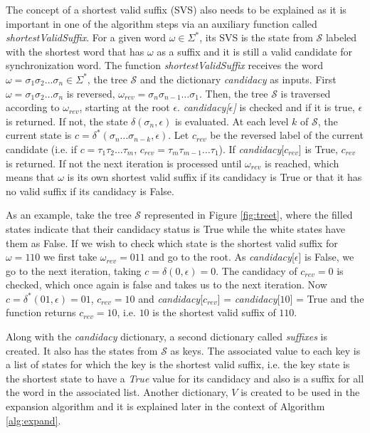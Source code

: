 {The concept of a shortest valid suffix (SVS) also needs to be explained as it is important in one of the algorithm steps via an auxiliary function called \textit{shortestValidSuffix}. For a given word $\omega \in \Sigma^*$, its SVS is the state from $\mathcal{S}$ labeled with the shortest word that has $\omega$ as a suffix and it is still a valid candidate for synchronization word. The function \textit{shortestValidSuffix} receives the word $\omega = \sigma_1\sigma_2\ldots\sigma_n \in \Sigma^*$, the tree $\mathcal{S}$ and the dictionary \textit{candidacy} as inputs. First $\omega = \sigma_1\sigma_2\ldots\sigma_n$ is reversed, $\omega_{rev} = \sigma_n\sigma_{n-1}\ldots\sigma_1$. Then, the tree $\mathcal{S}$ is traversed according to $\omega_{rev}$, starting at the root $\epsilon$. \textit{candidacy[$\epsilon$]} is checked and if it is true, $\epsilon$ is returned. If not, the state $\delta(\sigma_n, \epsilon)$ is evaluated. At each level $k$ of $\mathcal{S}$, the current state is $c = \delta^*(\sigma_n\ldots\sigma_{n-k},\epsilon)$. Let $c_{rev}$ be the reversed label of the current candidate (i.e. if $c = \tau_1\tau_2\ldots\tau_m$, $c_{rev} = \tau_m\tau_{m-1}\ldots\tau_1$). If \textit{candidacy}[$c_{rev}$] is True, $c_{rev}$ is returned. If not the next iteration is processed until $\omega_{rev}$ is reached, which means that $\omega$ is its own shortest valid suffix if its candidacy is True or that it has no valid suffix if its candidacy is False.
 
 As an example, take the tree $\mathcal{S}$ represented in Figure \ref{fig:treet}, where the filled states indicate that their candidacy status is True while the white states have them as False. If we wish to check which state is the shortest valid suffix for $\omega = 110$ we first take $\omega_{rev} = 011$ and go to the root. As \textit{candidacy}[$\epsilon$] is False, we go to the next iteration, taking $c = \delta(0, \epsilon) = 0$. The candidacy of $c_{rev} = 0$ is checked, which once again is false and takes us to the next iteration. Now $c = \delta^*(01, \epsilon) = 01$, $c_{rev} = 10$ and \textit{candidacy}[$c_{rev}$] = \textit{candidacy}[$10$] = True and the function returns $c_{rev} = 10$, i.e. $10$ is the shortest valid suffix of $110$.
 
 Along with the \textit{candidacy} dictionary, a second dictionary called \textit{suffixes} is created. It also has the states from $\mathcal{S}$ as keys. The associated value to each key is a list of states for which the key is the shortest valid suffix, i.e. the key state is the shortest state to have a \textit{True} value for its candidacy and also is a suffix for all the word in the associated list.  Another dictionary, $V$ is created to be used in the expansion algorithm and it is explained later in the context of Algorithm \ref{alg:expand}.

}
